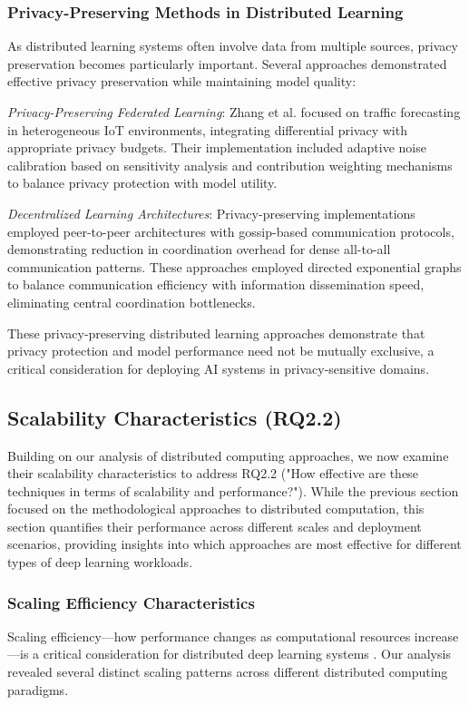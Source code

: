 \subsubsection{Privacy-Preserving Methods in Distributed Learning}
As distributed learning systems often involve data from multiple sources, privacy preservation becomes particularly important. Several approaches demonstrated effective privacy preservation while maintaining model quality:

\textit{Privacy-Preserving Federated Learning}: Zhang et al. \citep{Zhang20229876} focused on traffic forecasting in heterogeneous IoT environments, integrating differential privacy with appropriate privacy budgets. Their implementation included adaptive noise calibration based on sensitivity analysis and contribution weighting mechanisms to balance privacy protection with model utility.

\textit{Decentralized Learning Architectures}: Privacy-preserving implementations employed peer-to-peer architectures with gossip-based communication protocols, demonstrating reduction in coordination overhead for dense all-to-all communication patterns. These approaches employed directed exponential graphs to balance communication efficiency with information dissemination speed, eliminating central coordination bottlenecks.

These privacy-preserving distributed learning approaches demonstrate that privacy protection and model performance need not be mutually exclusive, a critical consideration for deploying AI systems in privacy-sensitive domains.

\subsection{Scalability Characteristics (RQ2.2)}
Building on our analysis of distributed computing approaches, we now examine their scalability characteristics to address RQ2.2 ("How effective are these techniques in terms of scalability and performance?"). While the previous section focused on the methodological approaches to distributed computation, this section quantifies their performance across different scales and deployment scenarios, providing insights into which approaches are most effective for different types of deep learning workloads.

\subsubsection{Scaling Efficiency Characteristics}
Scaling efficiency—how performance changes as computational resources increase—is a critical consideration for distributed deep learning systems \citep{Zhang20229876}. Our analysis revealed several distinct scaling patterns across different distributed computing paradigms.

